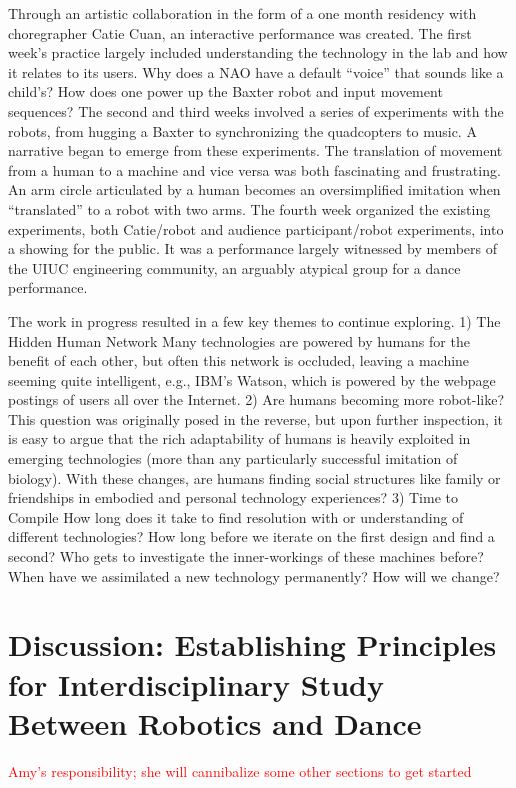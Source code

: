 \documentclass[arts,article,submit,moreauthors,pdftex,10pt,a4paper]{mdpi}
\begin{document}
Through an artistic collaboration in the form of a one month residency with choregrapher Catie Cuan, an interactive performance was created.  The first week’s practice largely included understanding the technology in the lab and how it relates to its users.  Why does a NAO have a default “voice” that sounds like a child’s?  How does one power up the Baxter robot and input movement sequences?  The second and third weeks involved a series of experiments with the robots, from hugging a Baxter to synchronizing the quadcopters to music.  A narrative began to emerge from these experiments.  The translation of movement from a human to a machine and vice versa was both fascinating and frustrating.  An arm circle articulated by a human becomes an oversimplified imitation when “translated” to a robot with two arms.  The fourth week organized the existing experiments, both Catie/robot and audience participant/robot experiments, into a showing for the public.  It was a performance largely witnessed by members of the UIUC engineering community, an arguably atypical group for a dance performance.  

The work in progress resulted in a few key themes to continue exploring.  1) The Hidden Human Network Many technologies are powered by humans for the benefit of each other, but often this network is occluded, leaving a machine seeming quite intelligent, e.g., IBM’s Watson, which is powered by the webpage postings of users all over the Internet.  2) Are humans becoming more robot-like? This question was originally posed in the reverse, but upon further inspection, it is easy to argue that the rich adaptability of humans is heavily exploited in emerging technologies (more than any particularly successful imitation of biology).  With these changes, are humans finding social structures like family or friendships in embodied and personal technology experiences?  3) Time to Compile How long does it take to find resolution with or understanding of different technologies?  How long before we iterate on the first design and find a second?  Who gets to investigate the inner-workings of these machines before?  When have we assimilated a new technology permanently? How will we change?

\section{Discussion: Establishing Principles for Interdisciplinary Study Between Robotics and Dance}

\textcolor{red}{Amy's responsibility; she will cannibalize some other sections to get started}
\end{document}
